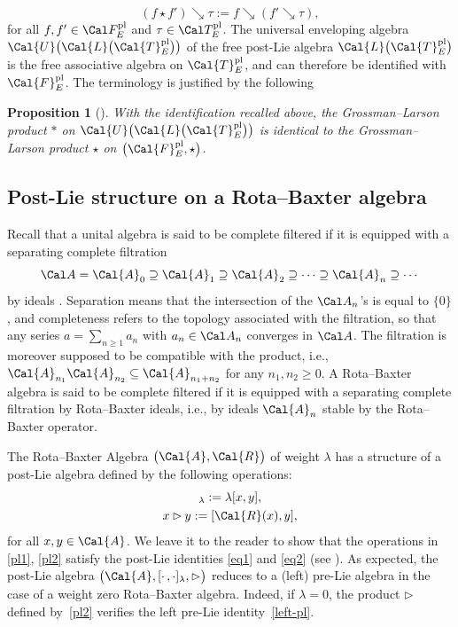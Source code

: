 \documentclass[pdftex]{sigma}
\numberwithin{equation}{section}
\newtheorem{Proposition}[Theorem]{Proposition}
 { \theoremstyle{definition}
\newtheorem{Definition}[Theorem]{Definition}
\newtheorem{Note}[Theorem]{Note}
\newtheorem{Example}[Theorem]{Example}
\newtheorem{Remark}[Theorem]{Remark} }
\begin{document}
\begin{equation*}
(f \star f') \searrow \tau := f \searrow (f' \searrow \tau),
\end{equation*}
for all $f,f'\in \Cal F_E^{\rm pl}$ and $\tau\in \Cal T_E^{\rm pl}$. The universal enveloping algebra $\Cal{U}\big(\Cal{L}\big(\Cal{T}^{\rm pl}_{E}\big)\big)$ of the free post-Lie algebra $\Cal{L}\big(\Cal{T}^{\rm pl}_E\big)$ is the free associative algebra on $\Cal{T}^{\rm pl}_{E}$, and can therefore be identified with $\Cal{F}^{\rm pl}_{E}$. The terminology is justified by the following

\begin{Proposition}[{\cite[Proposition 3.5]{ELM2015}}]
With the identification recalled above, the Grossman--Larson product $\ast$ on $\Cal{U}\big(\Cal{L}\big(\Cal{T}^{\rm pl}_{E}\big)\big)$
is identical to the Grossman--Larson product $\star$ on $\big(\Cal{F}^{\rm pl}_{E}, \star\big)$.
\end{Proposition}

\subsection{Post-Lie structure on a Rota--Baxter algebra}%

Recall that a unital algebra is said to be complete filtered if it is equipped with a separating complete filtration
\begin{displaymath}
\Cal A= \Cal{A}_0 \supseteq \Cal{A}_1 \supseteq
\Cal{A}_2 \supseteq \cdots \supseteq \Cal{A}_n \supseteq\cdots
\end{displaymath}
by ideals \cite{KLK04}. Separation means that the intersection of the $\Cal A_n$'s is equal to $\{0\}$, and completeness refers to the topology associated with the filtration, so that any series $a=\sum_{n\ge 1}a_n$ with $a_n\in\Cal A_n$ converges in $\Cal A$. The filtration is moreover supposed to be compatible with the product, i.e., $\Cal{A}_{n_1} \Cal{A}_{n_2}\subseteq \Cal{A}_{n_1 + n_2}$ for any $n_1,n_2\ge 0$. A Rota--Baxter algebra is said to be complete filtered if it is equipped with a separating complete filtration by Rota--Baxter ideals, i.e., by ideals $\Cal{A}_n$ stable by the Rota--Baxter operator.

The Rota--Baxter Algebra $\big(\Cal{A}, \Cal{R}\big)$ of weight $\lambda$ has a structure of a post-Lie algebra defined by the following operations:
\begin{gather}
[x, y]_{\lambda} := \lambda [x, y], \label{pl1}
\\
x \rhd y := [\Cal{R}(x), y] \label{pl2},
\end{gather}
for all $x, y \in \Cal{A}$. We leave it to the reader to show that the operations in \eqref{pl1}, \eqref{pl2} satisfy the post-Lie identities \eqref{eq1} and \eqref{eq2} (see \cite[Section~5.2]{BGN10}). As expected, the post-Lie algebra $\big(\Cal{A}, [\cdot\,, \cdot]_{\lambda}, \rhd \big)$ reduces to a (left) pre-Lie algebra in the case of a weight zero Rota--Baxter algebra. Indeed, if $\lambda =0$, the product $\rhd$ defined by~\eqref{pl2} verifies the left pre-Lie identity~\eqref{left-pl}.
\end{document}
